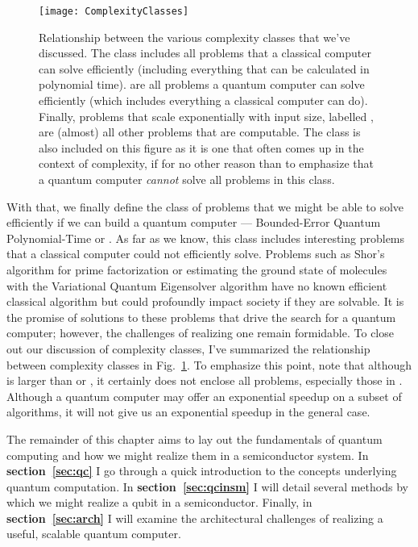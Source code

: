\begin{figure}
  \texttt{[image: ComplexityClasses]}
  \caption[Relationship between various complexity classes]
  {Relationship between the various complexity classes that we've discussed. The class
   includes all problems that a classical computer can solve efficiently (including
  everything that can be calculated in polynomial time).  are all problems a quantum computer can
  solve efficiently (which includes everything a classical computer can do). Finally, problems that scale exponentially
  with input size, labelled , are (almost) all other problems that are computable. The class
   is also included on this figure as it is one that often comes up in the context of complexity,
  if for no other reason than to emphasize that a quantum computer \emph{cannot} solve all problems in
  this class.}
  \label{fig:complexity}
\end{figure}

With that, we finally define the class of problems that we might be able to solve efficiently if we
can build a quantum computer --- Bounded-Error Quantum Polynomial-Time or . As far as we know,
this class includes interesting problems that a classical computer could not efficiently solve. Problems
such as Shor's algorithm for prime factorization\cite{Shor} or estimating the ground state of molecules with
the Variational Quantum Eigensolver algorithm\cite{ncomms5213} have no known efficient classical algorithm
but could profoundly impact society if they are solvable. It is the promise of solutions to these problems
that drive the search for a quantum computer; however, the challenges of realizing one remain formidable. To close
out our discussion of complexity classes, I've summarized the relationship between complexity classes in
Fig.~\ref{fig:complexity}. To emphasize this point, note that although  is larger than 
or , it certainly does not enclose all problems, especially those in . Although a
quantum computer may offer an exponential speedup on a subset of algorithms, it will not give us an exponential
speedup in the general case.

The remainder of this chapter aims to lay out the fundamentals of quantum computing and how we might realize
them in a semiconductor system. In \textbf{section~\ref{sec:qc}} I go through a quick introduction to the concepts
underlying quantum computation. In \textbf{section~\ref{sec:qcinsm}} I will detail several methods by which we might
realize a qubit in a semiconductor. Finally, in \textbf{section~\ref{sec:arch}} I will examine the architectural
challenges of realizing a useful, scalable quantum computer.

